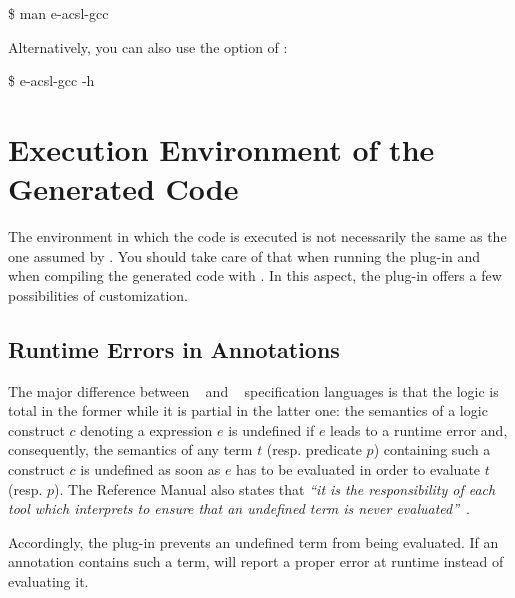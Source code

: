 \begin{shell}
\$ man e-acsl-gcc
\end{shell}

Alternatively, you can also use the  option of \eacslgcc:

\begin{shell}
\$ e-acsl-gcc -h
\end{shell}

\section{Execution Environment of the Generated Code} %
\label{sec:exec-env}

The environment in which the code is executed is not necessarily the same as
the one assumed by \framac. You should take care of that when running the \eacsl
plug-in and when compiling the generated code with \gcc. In this aspect, the
plug-in offers a few possibilities of customization.


\subsection{Runtime Errors in Annotations}
\label{sec:runtime-error}

The major difference between \acsl~\cite{acsl} and \eacsl~\cite{eacsl}
specification languages is that the logic is total in the former while it is
partial in the latter one: the semantics of a logic construct $c$ denoting a \C
expression $e$
is undefined if $e$ leads to a runtime error and, consequently, the semantics of
any term $t$ (resp. predicate $p$) containing such a construct $c$ is
undefined as soon as $e$ has to be evaluated in order to evaluate $t$
(resp. $p$). The \eacsl Reference Manual also states that \emph{``it is the
  responsibility of each tool which interprets \eacsl to ensure that an
  undefined term is never evaluated''}~\cite{eacsl}.

Accordingly, the \eacsl plug-in prevents an undefined term from being
evaluated. If an annotation contains such a term, \eacsl will report a proper
error at runtime instead of evaluating it.

